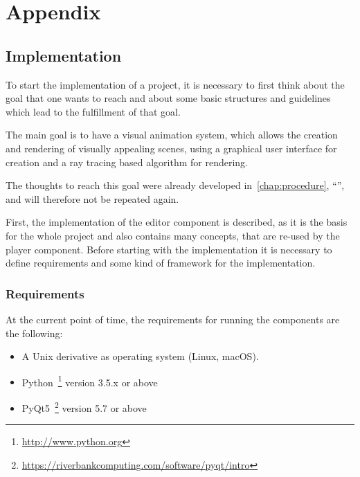 \documentclass[
    a4paper,      %
    10pt,         %
    openright,    %
    notitlepage,  %
    parskip=half, %
]{scrreprt}       %
\theoremstyle{definition}                    %
\begin{document}
\chapter{Appendix}
\label{chap:appendix}


\section{Implementation}
\label{sec:appendix-implementation}

To start the implementation of a project, it is necessary to first think about the
goal that one wants to reach and about some basic structures and guidelines
which lead to the fulfillment of that goal.

The main goal is to have a visual animation system, which allows the creation
and rendering of visually appealing scenes, using a graphical user interface for
creation and a ray tracing based algorithm for rendering.

The thoughts to reach this goal were already developed
in~\autoref{chap:procedure}, \enquote{}, and will
therefore not be repeated again.

First, the implementation of the editor component is described, as it is the
basis for the whole project and also contains many concepts, that are re-used by
the player component. Before starting with the implementation it is necessary to
define requirements and some kind of framework for the implementation.

\subsection{Requirements}
\label{subsec:appendix-requirements}

At the current point of time, the requirements for running the components are
the following:

\begin{itemize}
\item A Unix derivative as operating system (Linux, macOS).
\item Python~\footnote{\url{http://www.python.org}} version 3.5.x or above
\item PyQt5~\footnote{\url{https://riverbankcomputing.com/software/pyqt/intro}}
      version 5.7 or above
\end{itemize}
\end{document}
